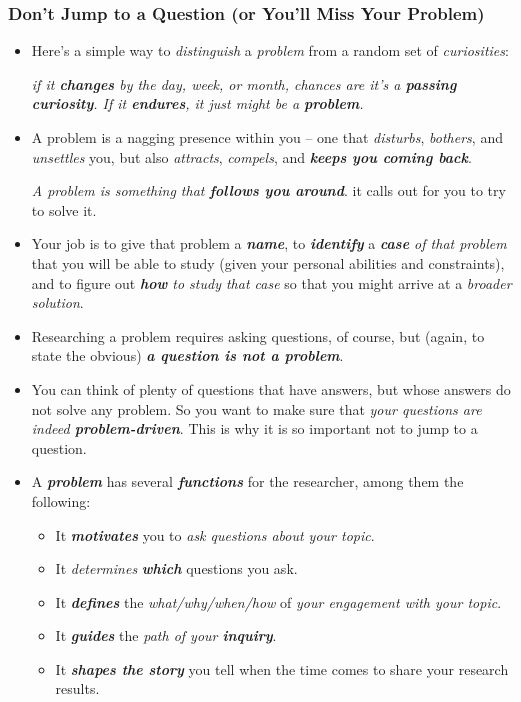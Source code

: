 \documentclass[11pt]{article}
\begin{document}
\subsubsection{Don’t Jump to a Question (or You’ll Miss Your Problem)}
\begin{itemize}
\item Here’s a simple way to \emph{distinguish} a \emph{problem} from a random set of \emph{curiosities}:

 \emph{if it \textbf{changes} by the day, week, or month, chances are it’s a \textbf{passing curiosity}. If it \textbf{endures}, it just might be a \textbf{problem}.}
 
\item A problem is a nagging presence within you -- one that \emph{disturbs}, \emph{bothers}, and \emph{unsettles} you, but also \emph{attracts}, \emph{compels}, and \textbf{\emph{keeps you coming back}}. 

\emph{A problem is something that \textbf{follows you around}}. it calls out for you to try to solve it.

\item Your job is to give that problem a \emph{\textbf{name}}, to \emph{\textbf{identify}} a \emph{\textbf{case} of that problem} that you will be able to study (given your personal abilities and constraints), and to figure out \emph{\textbf{how} to study that case} so that you might arrive at a \emph{broader solution}.

\item Researching a problem requires asking questions, of course, but (again, to state the obvious) \emph{\textbf{a question is not a problem}}.

\item You can think of plenty of questions that have answers, but whose answers do not solve any problem.  So you want to make sure that \emph{your questions are indeed \textbf{problem-driven}}. This is why it is so important not to jump to a question.

\item A \emph{\textbf{problem}} has several \emph{\textbf{functions}} for the researcher, among them the following:
\begin{itemize}
\item It \textbf{\emph{motivates}} you to \emph{ask questions about your topic}.
\item It \emph{determines} \emph{\textbf{which}} questions you ask.
\item It \emph{\textbf{defines}} the \emph{what/why/when/how} of \emph{your engagement with your topic}.
\item It \emph{\textbf{guides}} the \emph{path of your \textbf{inquiry}}.
\item It \emph{\textbf{shapes the story}} you tell when the time comes to share your research results.
\end{itemize}


\end{itemize}
\end{document}
